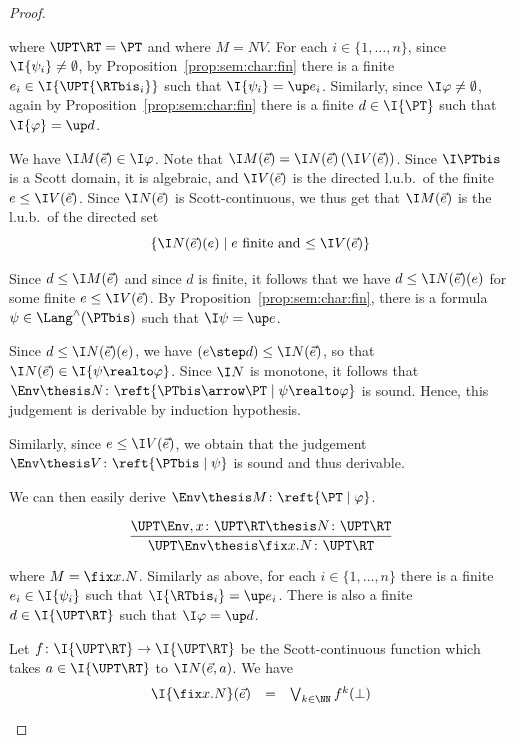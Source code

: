 \begin{proof}
\begin{description}
\noindent
where $\UPT\RT = \PT$ and where $M = N V$.
%
For each $i \in \{1,\dots,n\}$,
since $\I{\psi_i} \neq \emptyset$,
by Proposition~\ref{prop:sem:char:fin}
there is a finite $e_i \in \I{\UPT{\RTbis_i}}$
such that $\I{\psi_i} = \up e_i$.
%
Similarly, since $\I\varphi \neq \emptyset$,
again by Proposition~\ref{prop:sem:char:fin}
there is a finite $d \in \I{\PT}$
such that $\I{\varphi} = \up d$.

We have
$\I M(\vec e) \in \I\varphi$.
Note that
$\I M(\vec e) = \I N(\vec e)\left(\I V(\vec e) \right)$.
%
Since $\I\PTbis$ is a Scott domain, it is algebraic,
and $\I V(\vec e)$ is the directed l.u.b.\ of the finite $e \leq \I V(\vec e)$.
Since $\I N(\vec e)$ is Scott-continuous, we thus get
that $\I M(\vec e)$ is the l.u.b.\ of the directed set
\[
\left\{
  \I N(\vec e)(e)
  \mid
  \text{$e$ finite and $\leq \I V(\vec e)$}
\right\}
\]

\noindent
Since $d \leq \I M(\vec e)$ and since $d$ is finite,
it follows that we have
$d \leq \I N(\vec e)(e)$ for some finite $e \leq \I V(\vec e)$.
By Proposition~\ref{prop:sem:char:fin},
there is a formula $\psi \in \Lang^\land(\PTbis)$
such that $\I\psi = \up e$.


Since $d \leq \I N(\vec e)(e)$, we have
$(e \step d) \leq \I N(\vec e)$,
so that
$\I N(\vec e) \in \I{\psi \realto \varphi}$.
Since $\I N$ is monotone, it follows that 
$\Env \thesis N \colon \reft{\PTbis \arrow \PT \mid \psi \realto \varphi}$
is sound.
Hence, this judgement is derivable by induction hypothesis.

Similarly, since $e \leq \I V(\vec e)$,
we obtain that the judgement
$\Env \thesis V \colon \reft{\PTbis \mid \psi}$
is sound and thus derivable.

We can then easily derive $\Env \thesis M \colon \reft{\PT \mid \varphi}$.

\item[Case of]
\[
\dfrac{\UPT\Env,x\colon\UPT\RT \thesis N \colon \UPT\RT}
  {\UPT\Env \thesis \fix x.N \colon \UPT\RT}
\]

\noindent
where $M = \fix x.N$.
%
Similarly as above, for each $i \in \{1,\dots,n\}$
there is a finite $e_i \in \I{\psi_i}$
such that $\I{\RTbis_i} = \up e_i$.
There is also
a finite $d \in \I{\UPT\RT}$ such that $\I\varphi = \up d$.

Let $f \colon \I{\UPT\RT} \to \I{\UPT\RT}$
be the Scott-continuous function which takes
$a \in \I{\UPT\RT}$ to $\I N(\vec e,a)$.
We have
\[
\begin{array}{l l l}
  \I{\fix x.N}(\vec e)
& =
& \bigvee_{k \in \NN}
  f^k(\bot)
\end{array}
\]


\end{description}
\end{proof}
